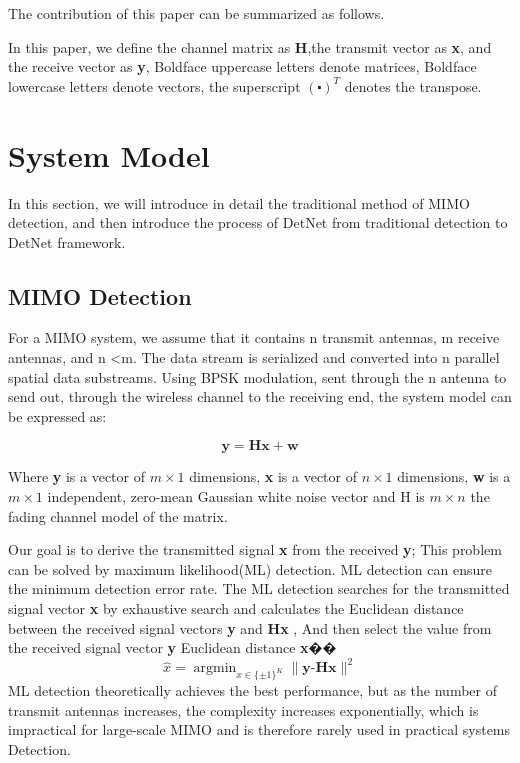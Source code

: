 \documentclass[conference]{IEEEtran}
\begin{document}
The contribution of this paper can be summarized as follows.

In this paper, we define the channel matrix as \textbf{H},the transmit vector as \textbf{x}, and the receive vector as \textbf{y}, Boldface uppercase letters denote matrices, Boldface lowercase letters denote vectors, the superscript ${(\centerdot)^T}$ denotes the transpose.

\section{System Model}
In this section, we will introduce in detail the traditional method of MIMO detection, and then introduce the process of DetNet from traditional detection to DetNet framework.
\subsection{MIMO Detection}
For a MIMO system, we assume that it contains n transmit antennas, m receive antennas, and n <m. The data stream is serialized and converted into n parallel spatial data substreams. Using BPSK modulation, sent through the n antenna to send out, through the wireless channel to the receiving end, the system model can be expressed as:

\begin{equation}
\label{basic model}
\textbf{y}=\textbf{Hx}+\textbf{w}
\end{equation}

Where \textbf{y} is a vector of ${m \times 1}$ dimensions, \textbf{x} is a vector of ${n \times 1}$ dimensions, \textbf{w} is a ${m \times 1}$ independent, zero-mean Gaussian white noise vector and H is ${m \times n}$ the fading channel model of the matrix.

Our goal is to derive the transmitted signal \textbf{x} from the received \textbf{y}; This problem can be solved by maximum likelihood(ML) detection. ML detection can ensure the minimum detection error rate. The ML detection searches for the transmitted signal vector \textbf{x} by exhaustive search and calculates the Euclidean distance between the received signal vectors \textbf{y} and \textbf{Hx} , And then select the value from the received signal vector \textbf{y} Euclidean distance \textbf{x}��
\begin{equation}
\label{ML}
\hat{x}=\mathop{\arg\min}_{x\in\{\pm1\}^K}\|\textbf{y-Hx}\|^2
\end{equation}
ML detection theoretically achieves the best performance, but as the number of transmit antennas increases, the complexity increases exponentially, which is impractical for large-scale MIMO and is therefore rarely used in practical systems Detection.
\end{document}
